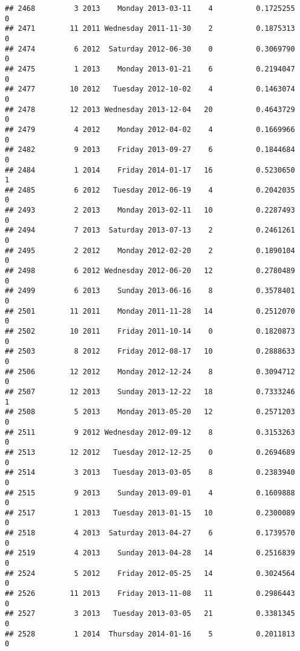 \documentclass[
]{article}
\begin{document}
\begin{verbatim}
## 2468         3 2013    Monday 2013-03-11    4          0.1725255             0
## 2471        11 2011 Wednesday 2011-11-30    2          0.1875313             0
## 2474         6 2012  Saturday 2012-06-30    0          0.3069790             0
## 2475         1 2013    Monday 2013-01-21    6          0.2194047             0
## 2477        10 2012   Tuesday 2012-10-02    4          0.1463074             0
## 2478        12 2013 Wednesday 2013-12-04   20          0.4643729             0
## 2479         4 2012    Monday 2012-04-02    4          0.1669966             0
## 2482         9 2013    Friday 2013-09-27    6          0.1844684             0
## 2484         1 2014    Friday 2014-01-17   16          0.5230650             1
## 2485         6 2012   Tuesday 2012-06-19    4          0.2042035             0
## 2493         2 2013    Monday 2013-02-11   10          0.2287493             0
## 2494         7 2013  Saturday 2013-07-13    2          0.2461261             0
## 2495         2 2012    Monday 2012-02-20    2          0.1890104             0
## 2498         6 2012 Wednesday 2012-06-20   12          0.2780489             0
## 2499         6 2013    Sunday 2013-06-16    8          0.3578401             0
## 2501        11 2011    Monday 2011-11-28   14          0.2512070             0
## 2502        10 2011    Friday 2011-10-14    0          0.1820873             0
## 2503         8 2012    Friday 2012-08-17   10          0.2888633             0
## 2506        12 2012    Monday 2012-12-24    8          0.3094712             0
## 2507        12 2013    Sunday 2013-12-22   18          0.7333246             1
## 2508         5 2013    Monday 2013-05-20   12          0.2571203             0
## 2511         9 2012 Wednesday 2012-09-12    8          0.3153263             0
## 2513        12 2012   Tuesday 2012-12-25    0          0.2694689             0
## 2514         3 2013   Tuesday 2013-03-05    8          0.2383940             0
## 2515         9 2013    Sunday 2013-09-01    4          0.1609888             0
## 2517         1 2013   Tuesday 2013-01-15   10          0.2300089             0
## 2518         4 2013  Saturday 2013-04-27    6          0.1739570             0
## 2519         4 2013    Sunday 2013-04-28   14          0.2516839             0
## 2524         5 2012    Friday 2012-05-25   14          0.3024564             0
## 2526        11 2013    Friday 2013-11-08   11          0.2986443             0
## 2527         3 2013   Tuesday 2013-03-05   21          0.3381345             0
## 2528         1 2014  Thursday 2014-01-16    5          0.2011813             0

\end{verbatim}
\end{document}
